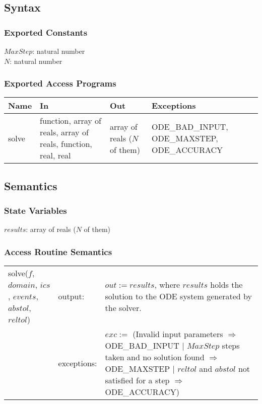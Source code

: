 \documentclass[12pt]{article}
\begin{document}
\subsection{Syntax}
\subsubsection{Exported Constants}
$MaxStep$: natural number \\
$N$: natural number
\subsubsection{Exported Access Programs}
\begin{center}
\begin{tabular}{p{2cm} p{4cm} p{4cm} p{4cm}}
\hline
\textbf{Name} & \textbf{In} & \textbf{Out} & \textbf{Exceptions} \\
\hline
solve & function, array of reals, array of reals, function, real, real & array of reals ($N$ of them) & ODE\_BAD\_INPUT, ODE\_MAXSTEP, ODE\_ACCURACY \\
\hline 
\end{tabular}
\end{center}
\subsection{Semantics}
\subsubsection{State Variables}
$results$: array of reals ($N$ of them)
\subsubsection{Access Routine Semantics}
\begin{center}
\begin{tabular}{l l p{5cm}}
solve($f$, $domain$, $ics$, $events$, $abstol$, $reltol$) & output: & $out := results$, where $results$ holds the solution to the ODE system generated by the solver. \\
& exceptions: & $exc :=$ (Invalid input parameters $\Rightarrow$ ODE\_BAD\_INPUT $|$ $MaxStep$ steps taken and no solution found $\Rightarrow$ ODE\_MAXSTEP $|$ $reltol$ and $abstol$ not satisfied for a step $\Rightarrow$ ODE\_ACCURACY)  \\
\end{tabular}
\end{center}
\end{document}
